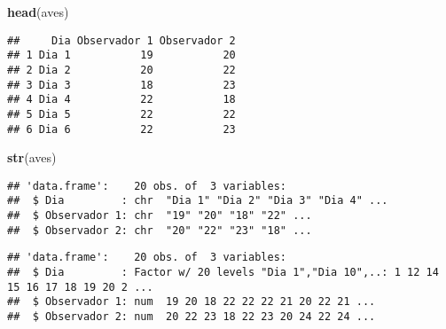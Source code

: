 \documentclass[]{book}
\newenvironment{Shaded}{\begin{snugshade}}{\end{snugshade}}
\newcommand{\DataTypeTok}[1]{\textcolor[rgb]{0.13,0.29,0.53}{#1}}
\newcommand{\KeywordTok}[1]{\textcolor[rgb]{0.13,0.29,0.53}{\textbf{#1}}}
\newcommand{\NormalTok}[1]{#1}
\newcommand{\OperatorTok}[1]{\textcolor[rgb]{0.81,0.36,0.00}{\textbf{#1}}}
\newcommand{\StringTok}[1]{\textcolor[rgb]{0.31,0.60,0.02}{#1}}
\begin{document}
\begin{Shaded}
\begin{Highlighting}[]
\KeywordTok{head}\NormalTok{(aves)}
\end{Highlighting}
\end{Shaded}

\begin{verbatim}
##     Dia Observador 1 Observador 2
## 1 Dia 1           19           20
## 2 Dia 2           20           22
## 3 Dia 3           18           23
## 4 Dia 4           22           18
## 5 Dia 5           22           22
## 6 Dia 6           22           23
\end{verbatim}

\begin{Shaded}
\begin{Highlighting}[]
\KeywordTok{str}\NormalTok{(aves)}
\end{Highlighting}
\end{Shaded}

\begin{verbatim}
## 'data.frame':    20 obs. of  3 variables:
##  $ Dia         : chr  "Dia 1" "Dia 2" "Dia 3" "Dia 4" ...
##  $ Observador 1: chr  "19" "20" "18" "22" ...
##  $ Observador 2: chr  "20" "22" "23" "18" ...
\end{verbatim}

\begin{Shaded}
\end{Shaded}

\begin{verbatim}
## 'data.frame':    20 obs. of  3 variables:
##  $ Dia         : Factor w/ 20 levels "Dia 1","Dia 10",..: 1 12 14 15 16 17 18 19 20 2 ...
##  $ Observador 1: num  19 20 18 22 22 22 21 20 22 21 ...
##  $ Observador 2: num  20 22 23 18 22 23 20 24 22 24 ...
\end{verbatim}
\end{document}
